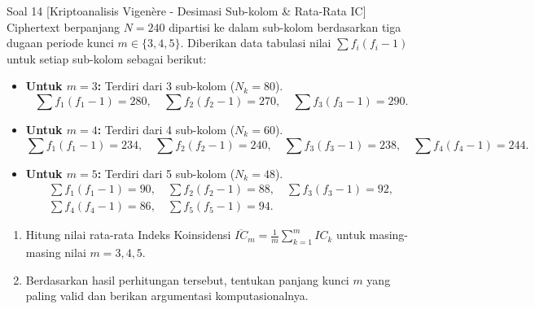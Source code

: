 \documentclass[11pt,a4paper]{article}
\begin{document}
\begin{soalanalisis}{Soal 14 [Kriptoanalisis Vigenère - Desimasi Sub-kolom \& Rata-Rata IC]}
Ciphertext berpanjang $N = 240$ dipartisi ke dalam sub-kolom berdasarkan tiga dugaan periode kunci $m \in \{3, 4, 5\}$. Diberikan data tabulasi nilai $\sum f_i(f_i - 1)$ untuk setiap sub-kolom sebagai berikut:
\begin{itemize}[leftmargin=*]
    \item \textbf{Untuk $m = 3$:} Terdiri dari 3 sub-kolom ($N_k = 80$).
    \[
    \sum f_1(f_1 - 1) = 280, \quad \sum f_2(f_2 - 1) = 270, \quad \sum f_3(f_3 - 1) = 290.
    \]
    \item \textbf{Untuk $m = 4$:} Terdiri dari 4 sub-kolom ($N_k = 60$).
    \[
    \sum f_1(f_1 - 1) = 234, \quad \sum f_2(f_2 - 1) = 240, \quad \sum f_3(f_3 - 1) = 238, \quad \sum f_4(f_4 - 1) = 244.
    \]
    \item \textbf{Untuk $m = 5$:} Terdiri dari 5 sub-kolom ($N_k = 48$).
    \begin{align*}
    \sum f_1(f_1 - 1) = 90, \quad \sum f_2(f_2 - 1) = 88, \quad \sum f_3(f_3 - 1) = 92, \\
    \sum f_4(f_4 - 1) = 86, \quad \sum f_5(f_5 - 1) = 94. \hspace{3cm}
    \end{align*}
\end{itemize}
\begin{enumerate}[label=(\alph*)]
    \item Hitung nilai rata-rata Indeks Koinsidensi $\overline{IC}_m = \frac{1}{m} \sum_{k=1}^m IC_k$ untuk masing-masing nilai $m = 3, 4, 5$.
    \item Berdasarkan hasil perhitungan tersebut, tentukan panjang kunci $m$ yang paling valid dan berikan argumentasi komputasionalnya.
\end{enumerate}
\end{soalanalisis}
\end{document}

